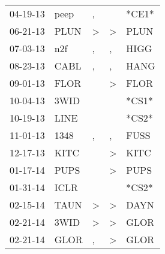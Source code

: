 \begin{supertabular}{p{0.07\textwidth}p{0.06\textwidth}p{0.02\textwidth}p{0.02\textwidth}p{0.06\textwidth}}
          04-19-13\textsuperscript{} &           peep\textsuperscript{} &                , &                  &                            *CE1* \\
          06-21-13\textsuperscript{} &           PLUN\textsuperscript{} &     \textgreater &     \textgreater &           PLUN\textsuperscript{} \\
          07-03-13\textsuperscript{} &            n2f\textsuperscript{} &                , &                , &           HIGG\textsuperscript{} \\
          08-23-13\textsuperscript{} &           CABL\textsuperscript{} &                , &                , &           HANG\textsuperscript{} \\
          09-01-13\textsuperscript{} &           FLOR\textsuperscript{} &                  &     \textgreater &           FLOR\textsuperscript{} \\
          10-04-13\textsuperscript{} &           3WID\textsuperscript{} &                  &                  &                            *CS1* \\
          10-19-13\textsuperscript{} &           LINE\textsuperscript{} &                  &                  &                            *CS2* \\
          11-01-13\textsuperscript{} &           1348\textsuperscript{} &                , &                , &           FUSS\textsuperscript{} \\
          12-17-13\textsuperscript{} &           KITC\textsuperscript{} &                  &     \textgreater &           KITC\textsuperscript{} \\
          01-17-14\textsuperscript{} &           PUPS\textsuperscript{} &                  &     \textgreater &           PUPS\textsuperscript{} \\
          01-31-14\textsuperscript{} &           ICLR\textsuperscript{} &                  &                  &                            *CS2* \\
          02-15-14\textsuperscript{} &           TAUN\textsuperscript{} &     \textgreater &     \textgreater &           DAYN\textsuperscript{} \\
          02-21-14\textsuperscript{} &           3WID\textsuperscript{} &     \textgreater &     \textgreater &           GLOR\textsuperscript{} \\
          02-21-14\textsuperscript{} &           GLOR\textsuperscript{} &                , &     \textgreater &           GLOR\textsuperscript{} \\

\end{supertabular}
